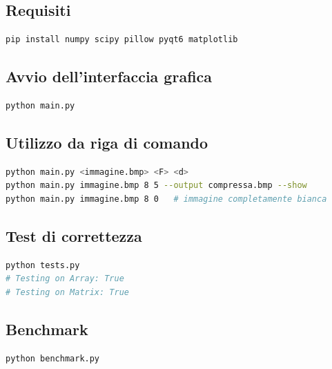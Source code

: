 \documentclass[12pt,a4paper]{article}
\begin{document}
\subsection{Requisiti}

\begin{lstlisting}[language=bash]
pip install numpy scipy pillow pyqt6 matplotlib
\end{lstlisting}

\subsection{Avvio dell'interfaccia grafica}

\begin{lstlisting}[language=bash]
python main.py
\end{lstlisting}

\subsection{Utilizzo da riga di comando}

\begin{lstlisting}[language=bash]
python main.py <immagine.bmp> <F> <d>
python main.py immagine.bmp 8 5 --output compressa.bmp --show
python main.py immagine.bmp 8 0   # immagine completamente bianca
\end{lstlisting}

\subsection{Test di correttezza}

\begin{lstlisting}[language=bash]
python tests.py
# Testing on Array: True
# Testing on Matrix: True
\end{lstlisting}

\subsection{Benchmark}

\begin{lstlisting}[language=bash]
python benchmark.py
\end{lstlisting}
\end{document}
